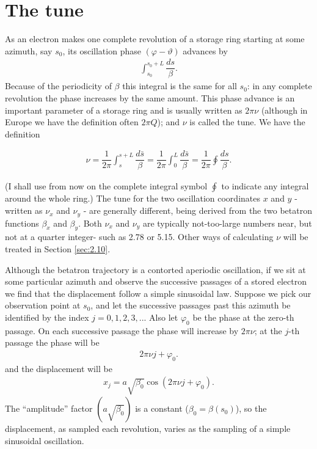 \documentclass[../sands-adaptation.tex]{subfiles}
\begin{document}
\section{The tune} \label{sec:2.7}

As an electron makes one complete revolution of a storage ring starting at some azimuth, say $s_0$, its oscillation phase $(\varphi - \vartheta)$ advances by
\begin{align*}
	\int_{s_0}^{s_0+L}\dfrac{ds}{\beta}.
\end{align*}
Because of the periodicity of $\beta$ this integral is the same for all $s_0$: in any complete revolution the phase increases by the same amount. This phase advance is an important parameter of a storage ring and is usually written as $2\pi\nu$ (although in Europe we have the definition often $2\pi Q$); and $\nu$ is called the tune. We have the definition

\begin{align}\label{eq:2.60}
	\boxed{\nu = \dfrac{1}{2\pi} \int_s^{s+L} \dfrac{d\bar{s}}{\beta} = \dfrac{1}{2\pi}\int_0^L \dfrac{d\bar{s}}{\beta} = \dfrac{1}{2\pi} \oint \dfrac{ds}{\beta}}.
\end{align}

(I shall use from now on the complete integral symbol $\oint$ to indicate any integral
around the whole ring.) The tune for the two oscillation coordinates
$x$ and $y$ - written as $\nu_x$ and $\nu_y$ - are generally different, being derived from the two betatron functions $\beta_x$ and $\beta_y$. Both $\nu_x$ and $\nu_y$ are typically not-too-large numbers near, but not at a quarter integer- such as 2.78 or 5.15. Other ways of calculating $\nu$ will be treated in Section \ref{sec:2.10}.

Although the betatron trajectory is a contorted aperiodic oscillation, if we sit at some particular azimuth and observe the successive passages of a stored electron we find that the displacement follow a simple sinusoidal law. Suppose we pick our observation point at $s_0$, and let the successive passages past this azimuth be identified by the index $j=0,1,2,3,...$ Also let $\varphi_0$ be the phase at the zero-th passage. On each successive passage the phase will increase by $2\pi \nu$; at the $j$-th passage the phase will be
\begin{align*}
	2\pi \nu j + \varphi_0.
\end{align*}
and the displacement will be
\begin{align}\label{eq_xj}
	x_j = a \sqrt{\beta_0} \cos(2\pi \nu j + \varphi_0).
\end{align}
The “amplitude” factor $(a \sqrt{\beta_0})$ is a constant ($\beta_0 = \beta(s_0)$), so the displacement, as sampled each revolution, varies as the sampling of a simple sinusoidal oscillation.
\end{document}
